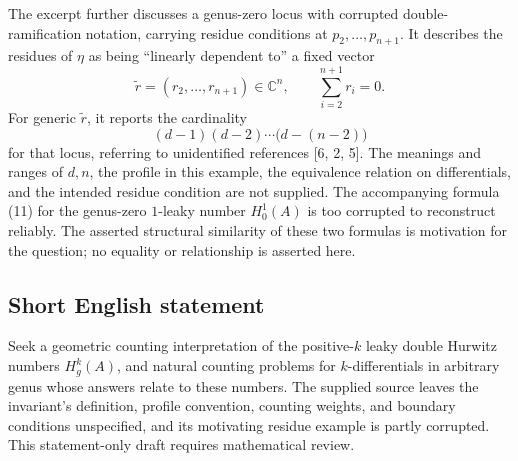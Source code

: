 \documentclass[11pt]{article}
\newcommand{\C}{\mathbb{C}}
\begin{document}
The excerpt further discusses a genus-zero locus with corrupted double-ramification notation, carrying residue conditions at \(p_2,\ldots,p_{n+1}\). It describes the residues of \(\eta\) as being ``linearly dependent to'' a fixed vector
\[
\widetilde r=(r_2,\ldots,r_{n+1})\in\C^n,
\qquad \sum_{i=2}^{n+1}r_i=0.
\]
For generic \(\widetilde r\), it reports the cardinality
\[
(d-1)(d-2)\cdots\bigl(d-(n-2)\bigr)
\tag{10}
\]
for that locus, referring to unidentified references [6, 2, 5]. The meanings and ranges of \(d,n\), the profile in this example, the equivalence relation on differentials, and the intended residue condition are not supplied. The accompanying formula (11) for the genus-zero \(1\)-leaky number \(H_0^1(A)\) is too corrupted to reconstruct reliably. The asserted structural similarity of these two formulas is motivation for the question; no equality or relationship is asserted here.
\subsection{Short English statement}
Seek a geometric counting interpretation of the positive-\(k\) leaky double Hurwitz numbers \(H_g^k(A)\), and natural counting problems for \(k\)-differentials in arbitrary genus whose answers relate to these numbers. The supplied source leaves the invariant's definition, profile convention, counting weights, and boundary conditions unspecified, and its motivating residue example is partly corrupted. This statement-only draft requires mathematical review.
\end{document}
